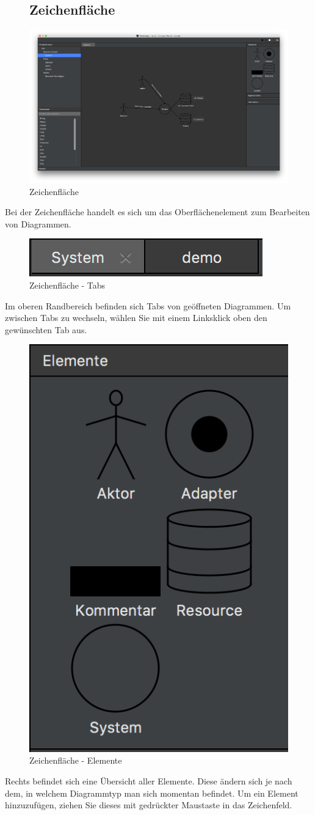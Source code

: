 \begin{figure}[H]
\subsection{Zeichenfläche}
	\centering
	\includegraphics[width=1\textwidth]{Design_Dark.png}
	\caption{Zeichenfläche}	
\end{figure}
Bei der Zeichenfläche handelt es sich um das Oberflächenelement zum Bearbeiten von Diagrammen. 

\begin{figure}[H]
	\centering
	\includegraphics[width=.4\textwidth]{Tabs.png}
	\caption{Zeichenfläche - Tabs}	
\end{figure}
Im oberen Randbereich befinden sich Tabs von geöffneten Diagrammen. Um zwischen Tabs zu wechseln, wählen Sie mit einem Linksklick oben den gewünschten Tab aus.

\begin{figure}[H]
	\centering
	\includegraphics[width=.4\textwidth]{Elemente.png}
	\caption{Zeichenfläche - Elemente}	
\end{figure}
Rechts befindet sich eine Übersicht aller Elemente. Diese ändern sich je nach dem, in welchem Diagrammtyp man sich momentan befindet. Um ein Element hinzuzufügen, ziehen Sie dieses mit gedrückter Maustaste in das Zeichenfeld. 

